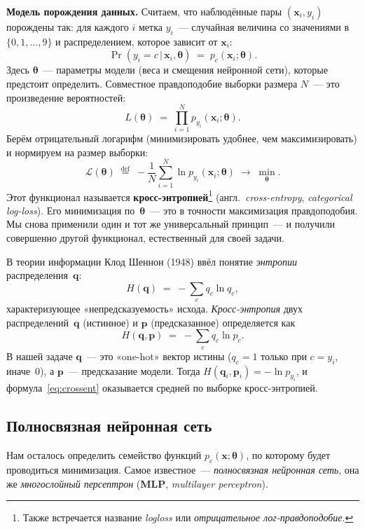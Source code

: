 \textbf{Модель порождения данных.} Считаем, что наблюдённые пары
$(\mathbf x_i,y_i)$ порождены так: для каждого $i$ метка $y_i$~---
случайная величина со значениями в $\{0,1,\dots,9\}$ и распределением,
которое зависит от $\mathbf x_i$:
\[
\Pr(y_i=c\,|\,\mathbf x_i,\boldsymbol\theta)\;=\;p_c(\mathbf x_i;\boldsymbol\theta).
\]
Здесь $\boldsymbol\theta$~--- параметры модели (веса и смещения нейронной
сети), которые предстоит определить. Совместное правдоподобие выборки
размера $N$~--- это произведение вероятностей:
\[
L(\boldsymbol\theta)\;=\;\prod_{i=1}^{N} p_{y_i}(\mathbf x_i;\boldsymbol\theta).
\]
Берём отрицательный логарифм (минимизировать удобнее, чем максимизировать)
и нормируем на размер выборки:
\begin{equation}\label{eq:crossent}
\boxed{\;\;
\mathcal L(\boldsymbol\theta)\;\stackrel{\mathrm{def}}{=}\;
-\frac{1}{N}\sum_{i=1}^{N}\ln p_{y_i}(\mathbf x_i;\boldsymbol\theta)\;\longrightarrow\;\min_{\boldsymbol\theta}.
\;\;}
\end{equation}
Этот функционал называется \textbf{кросс-энтропией}\footnote{Также
встречается название \emph{logloss} или \emph{отрицательное
лог-правдоподобие}.} (англ.\ \emph{cross-entropy}, \emph{categorical
log-loss}). Его минимизация по~$\boldsymbol\theta$~--- это в точности
максимизация правдоподобия. Мы снова применили один и тот же
универсальный принцип~--- и получили совершенно другой функционал,
естественный для своей задачи.

\begin{notebox}[title={Почему «кросс-энтропия»?}]
В теории информации Клод Шеннон (1948) ввёл понятие \emph{энтропии}
распределения~$\mathbf q$:
\[
H(\mathbf q)\;=\;-\sum_c q_c\ln q_c,
\]
характеризующее «непредсказуемость» исхода. \emph{Кросс-энтропия}
двух распределений~$\mathbf q$ (истинное) и $\mathbf p$ (предсказанное)
определяется как
\[
H(\mathbf q,\mathbf p)\;=\;-\sum_c q_c\ln p_c.
\]
В нашей задаче $\mathbf q$~--- это «one-hot» вектор истины
($q_c=1$ только при $c=y_i$, иначе~$0$), а $\mathbf p$~--- предсказание
модели. Тогда $H(\mathbf q_i,\mathbf p_i)=-\ln p_{y_i}$, и
формула~\eqref{eq:crossent} оказывается средней по выборке
кросс-энтропией.
\end{notebox}

\subsection{Полносвязная нейронная сеть}
\label{ssec:mlp}

Нам осталось определить семейство функций $p_c(\mathbf x;\boldsymbol\theta)$,
по которому будет проводиться минимизация. Самое известное~---
\emph{полносвязная нейронная сеть}, она же \emph{многослойный персептрон}
(\textbf{MLP}, \emph{multilayer perceptron}).

